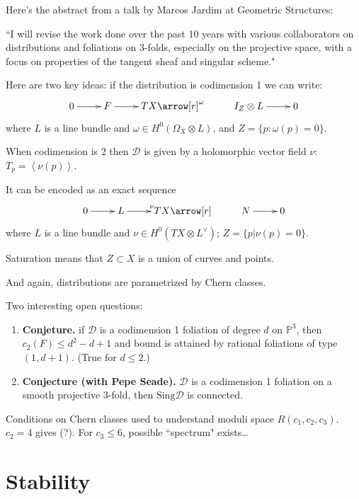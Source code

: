 Here's the abstract from a talk by Marcos Jardim at Geometric Structures:

``I will revise the work done over the past 10 years with various collaborators
on distributions and foliations on 3-folds, especially on the projective space,
with a focus on properties of the tangent sheaf and singular scheme."

Here are two key ideas: if the distribution is codimension 1 we can write:
$$
\xymatrix{
0\ar[r]&F\ar[r]&TX\arrow[r]^{\omega}&I_Z \otimes L\ar[r]&0
}
$$
where $L$ is a line bundle and $\omega \in H^{0}(\Omega_X \otimes L)$, and
$Z=\{p:\omega(p)=0\}$.

When codimension is 2 then $\mathcal{D}$ is given by a holomorphic vector field 
$\nu$: $T_p=\left<\nu(p)\right>$.

It can be encoded as an exact sequence
$$
\xymatrix{
	0\ar[r]&L\ar[r]^{\nu}&TX\arrow[r]&N\ar[r]&0
}
$$
where $L$ is a line bundle and $\nu \in H^{0}(TX \otimes L^\vee)$;
  $Z=\{p | \nu(p) = 0\}$.

\begin{remark}
\label{remark-stauration}
Saturation means that $Z \subset X$ is a union of curves and points.
\end{remark}

And again, distributions are parametrized by Chern classes.

Two interesting open questions:
\begin{enumerate}
\item {\bf Conjeture.} if $\mathcal{D}$ is a codimension 1 foliation of degree
$d$ on $\mathbb{P}^3$, then $c_2(F)\leq d^2-d+1$ and bound is attained
by rational foliations of type $(1,d+1)$. (True for $d \leq 2$.)
\item {\bf Conjecture (with Pepe Seade).} $\mathcal{D}$ is a codimension 1 
foliation on a smooth projective 3-fold, then $\text{Sing}\mathcal{D}$ is connected.
\end{enumerate}

\begin{theorem}
\label{theorem-jardim-muniz}
Conditions on Chern classes used to understand moduli space $R(c_1,c_2,c_3)$.
$c_2=4$ gives (?). For $c_3\leq 6$, possible ``spectrum" exists…
\end{theorem}

\section{Stability}
\label{section-stability}

